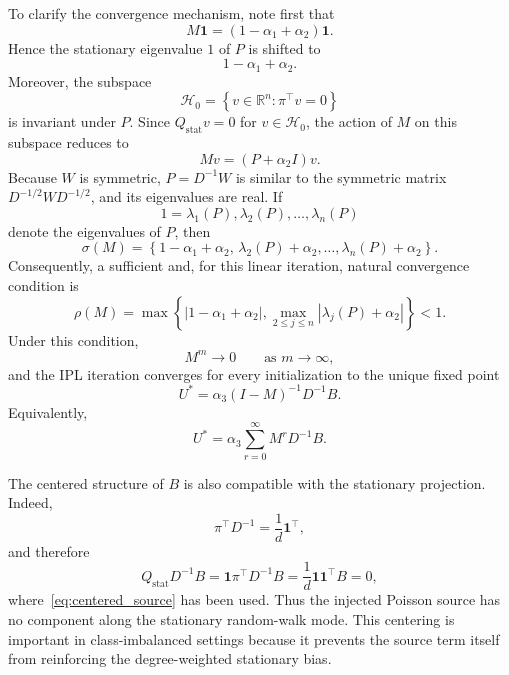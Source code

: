 \documentclass[11pt,a4paper]{article}
\begin{document}
To clarify the convergence mechanism, note first that
\[
M\mathbf{1}
=
(1-\alpha_1+\alpha_2)\mathbf{1}.
\]
Hence the stationary eigenvalue \(1\) of \(P\) is shifted to
\[
1-\alpha_1+\alpha_2.
\]
Moreover, the subspace
\[
\mathcal{H}_0
=
\left\{
v\in\mathbb{R}^{n}:
\pi^\top v=0
\right\}
\]
is invariant under \(P\). Since \(Q_{\mathrm{stat}}v=0\) for
\(v\in\mathcal{H}_0\), the action of \(M\) on this subspace reduces to
\[
Mv=(P+\alpha_2I)v.
\]
Because \(W\) is symmetric, \(P=D^{-1}W\) is similar to the symmetric matrix
\(D^{-1/2}WD^{-1/2}\), and its eigenvalues are real. If
\[
1=\lambda_1(P),\lambda_2(P),\ldots,\lambda_n(P)
\]
denote the eigenvalues of \(P\), then
\begin{equation}
\sigma(M)
=
\left\{
1-\alpha_1+\alpha_2,\,
\lambda_2(P)+\alpha_2,\ldots,
\lambda_n(P)+\alpha_2
\right\}.
\label{eq:M_spectrum}
\end{equation}
Consequently, a sufficient and, for this linear iteration, natural
convergence condition is
\begin{equation}
\rho(M)
=
\max
\left\{
|1-\alpha_1+\alpha_2|,
\max_{2\leq j\leq n}
|\lambda_j(P)+\alpha_2|
\right\}
<1.
\label{eq:ipl_convergence_condition}
\end{equation}
Under this condition,
\[
M^m\longrightarrow 0
\qquad\text{as }m\to\infty,
\]
and the IPL iteration converges for every initialization to the unique
fixed point
\begin{equation}
U^*
=
\alpha_3
(I-M)^{-1}D^{-1}B.
\label{eq:ipl_fixed_point}
\end{equation}
Equivalently,
\begin{equation}
U^*
=
\alpha_3
\sum_{r=0}^{\infty}
M^rD^{-1}B.
\label{eq:ipl_neumann}
\end{equation}

The centered structure of \(B\) is also compatible with the stationary
projection. Indeed,
\[
\pi^\top D^{-1}
=
\frac{1}{d}\mathbf{1}^\top,
\]
and therefore
\begin{equation}
Q_{\mathrm{stat}}D^{-1}B
=
\mathbf{1}\pi^\top D^{-1}B
=
\frac{1}{d}\mathbf{1}\mathbf{1}^\top B
=
0,
\label{eq:source_stationary_orthogonality}
\end{equation}
where~\eqref{eq:centered_source} has been used. Thus the injected Poisson
source has no component along the stationary random-walk mode. This
centering is important in class-imbalanced settings because it prevents the
source term itself from reinforcing the degree-weighted stationary bias.
\end{document}
